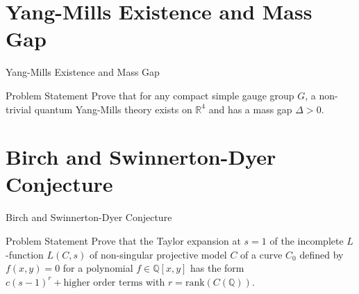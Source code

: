 \documentclass[handout]{beamer}
\newcommand{\Real}{\mathbb{R}}
\newcommand{\Rational}{\mathbb{Q}}
\begin{document}
  \section{Yang-Mills Existence and Mass Gap}
  \begin{frame}{Yang-Mills Existence and Mass Gap}
      \begin{block}{Problem Statement}
          Prove that for any compact simple gauge group $G$, a non-trivial
          quantum Yang-Mills theory exists on $\Real^4$ and has a mass gap
          $\Delta > 0$.
      \end{block}
  \end{frame}

  \section{Birch and Swinnerton-Dyer Conjecture}
  \begin{frame}{Birch and Swinnerton-Dyer Conjecture}
      \begin{block}{Problem Statement}
          Prove that the Taylor expansion at $s=1$ of the incomplete
          $L$-function $L(C, s)$ of non-singular projective model $C$ of a
          curve $C_0$ defined by $f(x, y) = 0$ for a polynomial
          $f \in \Rational [x, y]$ has the form
          $c(s-1)^r + \text{higher order terms}$ with
          $r = \mathrm{rank}(C(\Rational))$.
      \end{block}
  \end{frame}
\end{document}
